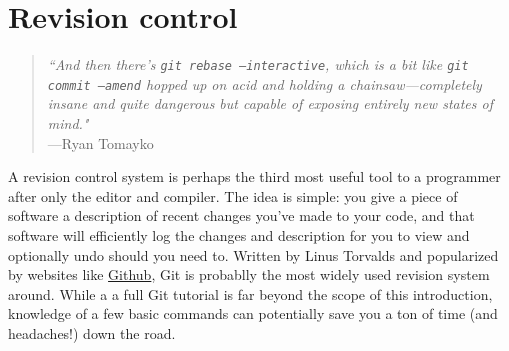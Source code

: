 \chapter{Revision control}
\label{chap:Revision control}

\begin{quote}
\emph{``And then there's \texttt{git rebase --interactive}, which is a bit like \texttt{git commit --amend} hopped up on acid and holding a chainsaw---completely insane and quite dangerous but capable of exposing entirely new states of mind."} \\ \hspace*{\fill}---Ryan Tomayko
\end{quote}

A revision control system is perhaps the third most useful tool to a programmer after only the editor and compiler.
The idea is simple: you give a piece of software a description of recent changes you've made to your code, and that software will efficiently log the changes and description for you to view and optionally undo should you need to.
Written by Linus Torvalds and popularized by websites like \href{https://Github.com/}{Github}, Git is probablly the most widely used revision system around.
While a a full Git tutorial is far beyond the scope of this introduction, knowledge of a few basic commands can potentially save you a ton of time (and headaches!) down the road.

